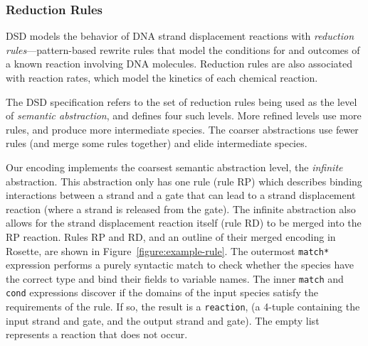 \documentclass{article}
\begin{document}
\subsubsection{Reduction Rules}
DSD models the behavior of DNA strand displacement reactions with
\emph{reduction rules}---pattern-based rewrite rules
that model the conditions for and outcomes of a known reaction
involving DNA molecules. Reduction rules are also associated with
reaction rates, which model the kinetics of each chemical reaction.

The DSD specification refers to the set of reduction rules being used
as the level of \emph{semantic abstraction}, and defines four such levels.
More refined levels
use more rules, and produce more intermediate species. The
coarser abstractions use fewer rules (and merge some rules together) and
elide intermediate species.

Our encoding implements the coarsest semantic abstraction level,
the \emph{infinite} abstraction. This abstraction only has one
rule (rule RP) which describes binding interactions between a strand and a gate
that can lead to a strand displacement reaction (where a strand is
released from the gate). The infinite abstraction also allows for the strand
displacement reaction itself (rule RD)
to be merged into the RP reaction.
Rules RP and RD, and an outline of their merged encoding in Rosette, are shown in
Figure~\ref{figure:example-rule}. The outermost \verb;match*; expression
performs a purely syntactic match to check whether the species have
the correct type and bind their fields to variable names.
The inner \verb;match; and \verb;cond;
expressions discover if the domains of the input species satisfy
the requirements of the rule. If so, the result is a \verb;reaction;,
(a 4-tuple containing the input strand and gate, and the
output strand and gate). The empty list represents a reaction that
does not occur.
\end{document}
